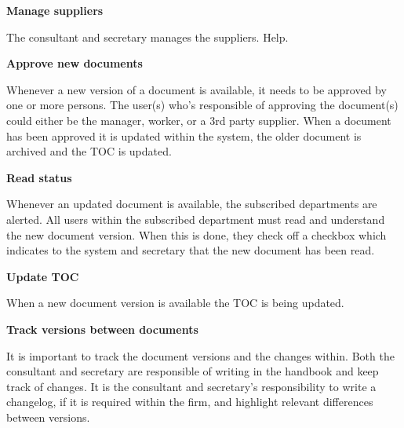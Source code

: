 \textbf{Manage suppliers}

The consultant and secretary manages the suppliers. Help.

\textbf{Approve new documents}

Whenever a new version of a document is available, it needs to be approved by one or more persons.
The user(s) who’s responsible of approving the document(s) could either be the manager, worker, or a 3rd party supplier.
When a document has been approved it is updated within the system, the older document is archived and the TOC is updated.

\textbf{Read status}

Whenever an updated document is available, the subscribed departments are alerted.
All users within the subscribed department must read and understand the new document version.
When this is done, they check off a checkbox which indicates to the system and secretary that the new document has been read.


\textbf{Update TOC}

When a new document version is available the TOC is being updated.

\textbf{Track versions between documents}

It is important to track the document versions and the changes within.
Both the consultant and secretary are responsible of writing in the handbook and keep track of changes.
It is the consultant and secretary’s responsibility to write a changelog, if it is required within the firm, and highlight relevant differences between versions.


